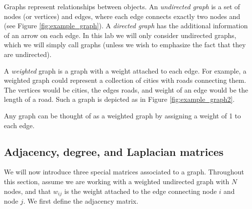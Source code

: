 %
%



Graphs represent relationships between objects.
An \emph{undirected graph} is a set of nodes (or vertices) and edges, where each edge connects exactly two nodes and (see Figure \ref{fig:example_graph}).
A \emph{directed graph} has the additional information of an arrow on each edge. 
In this lab we will only consider undirected graphs, which we will simply call graphs (unless we wish to emphasize the fact that they are undirected).


A \emph{weighted} graph is a graph with a weight attached to each edge.
For example, a weighted graph could represent a collection of cities with roads connecting them.
The vertices would be cities, the edges roads, and weight of an edge would be the length of a road.
Such a graph is depicted as in Figure \ref{fig:example_graph2}.

Any graph can be thought of as a weighted graph by assigning a weight of 1 to each edge.

\subsection*{Adjacency, degree, and Laplacian matrices}
We will now introduce three special matrices associated to a graph. 
Throughout this section, assume we are working with a weighted undirected graph with $N$ nodes, and that $w_{ij}$ is the weight attached to the edge connecting node $i$ and node $j$.
We first define the adjacency matrix.

